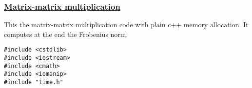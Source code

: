 \documentclass{beamer}
\begin{document}
\begin{frame}
\frametitle{\href{{https://github.com/CompPhysics/ComputationalPhysicsMSU/blob/master/doc/Programs/LecturePrograms/programs/Classes/cpp/program9.cpp}}{Matrix-matrix multiplication}}

This the matrix-matrix multiplication code with plain c++ memory allocation. It computes at the end the Frobenius norm.



































































\begin{verbatim}
#include <cstdlib>
#include <iostream>
#include <cmath>
#include <iomanip>
#include "time.h"


\end{verbatim}
\end{frame}
\end{document}
